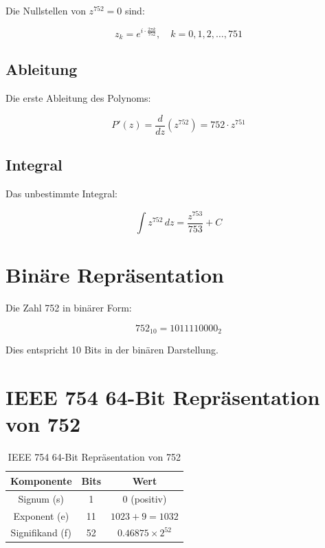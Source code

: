 \documentclass[12pt]{book}
\begin{document}
Die Nullstellen von $z^{752} = 0$ sind:

\begin{equation}
z_k = e^{i \cdot \frac{2\pi k}{752}}, \quad k = 0, 1, 2, \ldots, 751
\end{equation}

\subsection{Ableitung}

Die erste Ableitung des Polynoms:

\begin{equation}
P'(z) = \frac{d}{dz}(z^{752}) = 752 \cdot z^{751}
\end{equation}

\subsection{Integral}

Das unbestimmte Integral:

\begin{equation}
\int z^{752} \, dz = \frac{z^{753}}{753} + C
\end{equation}

\section{Binäre Repräsentation}

Die Zahl 752 in binärer Form:

\begin{equation}
752_{10} = 1011110000_2
\end{equation}

Dies entspricht 10 Bits in der binären Darstellung.

\section{IEEE 754 64-Bit Repräsentation von 752}

\begin{table}[h]
\centering
\begin{tabular}{|c|c|c|}
\hline
\textbf{Komponente} & \textbf{Bits} & \textbf{Wert} \\
\hline
Signum (s) & 1 & 0 (positiv) \\
\hline
Exponent (e) & 11 & $1023 + 9 = 1032$ \\
\hline
Signifikand (f) & 52 & $0.46875 \times 2^{52}$ \\
\hline
\end{tabular}
\caption{IEEE 754 64-Bit Repräsentation von 752}
\end{table}
\end{document}
